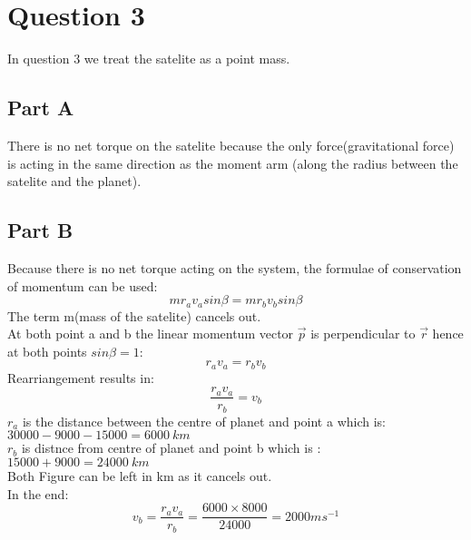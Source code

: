 \documentclass[10pt]{article}
\begin{document}
\section{Question 3}
In question 3 we treat the satelite as a point mass.
\subsection{Part A}
There is no net torque on the satelite because the only force(gravitational force) is acting in the same direction as the moment arm (along the radius between the satelite and the planet). 
\subsection{Part B}
Because there is no net torque acting on the system, the formulae of conservation of momentum can be used: \\
\begin{displaymath}
mr_av_asin\beta=mr_bv_bsin\beta
\end{displaymath}
The term m(mass of the satelite) cancels out. \\
At both point a and b the linear momentum vector $\vec{p}$ is perpendicular to $\vec{r}$ hence at both points $sin\beta=1$: \\
\begin{displaymath}
r_av_a=r_bv_b
\end{displaymath}
Rearriangement results in: \\
\begin{displaymath}
\frac{r_av_a}{r_b}=v_b
\end{displaymath}
$r_a$ is the distance between the centre of planet and point a which is: \\
$30000-9000-15000=6000 \ km$  \\
$r_b$ is distnce from centre of planet and point b which is : \\ $15000+9000 = 24000 \ km$ \\
Both Figure can be left in km as it cancels out. \\
In the end:
\begin{displaymath}
v_b=\frac{r_av_a}{r_b}=\frac{6000\times8000}{24000}=2000ms^{-1}
\end{displaymath}
\pagebreak
\end{document}
